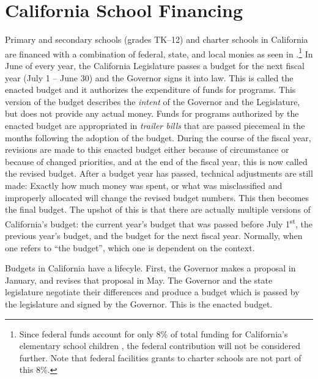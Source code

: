 \section{California School Financing}\label{sec:ca-overview}\indent

Primary and secondary schools (grades TK–12) and charter schools in California are financed with a combination of federal, state, and local monies as seen in .\footnote{Since federal funds account for only 8\% of total funding for California's elementary school children \parencite{LAO2021}, the federal contribution will not be considered further. Note that federal facilities grants to charter schools are not part of this 8\%.} In June of every year, the California Legislature passes a budget for the next fiscal year (July 1 – June 30) and the Governor signs it into law. This is called the enacted budget and it authorizes the expenditure of funds for programs. This version of the budget describes the \textit{intent} of the Governor and the Legislature, but does not provide any actual money. Funds for programs authorized by the enacted budget are appropriated in \textit{trailer bills} that are passed piecemeal in the months following the adoption of the budget. During the course of the fiscal year, revisions are made to this enacted budget either because of circumstance or because of changed priorities, and at the end of the fiscal year, this is now called the revised budget. After a budget year has passed, technical adjustments are still made: Exactly how much money was spent, or what was misclassified and improperly allocated will change the revised budget numbers. This then becomes the final budget. The upshot of this is that there are actually multiple versions of California's budget: the current year's budget that was passed before July 1\textsuperscript{st}, the previous year's budget, and the budget for the next fiscal year. Normally, when one refers to ``the budget'', which one is dependent on the context.

Budgets in California have a lifecyle. First, the Governor makes a proposal in January, and revises that proposal in May. The Governor and the state legislature negotiate their differences and produce a budget which is passed by the legislature and signed by the Governor. This is the enacted budget.

